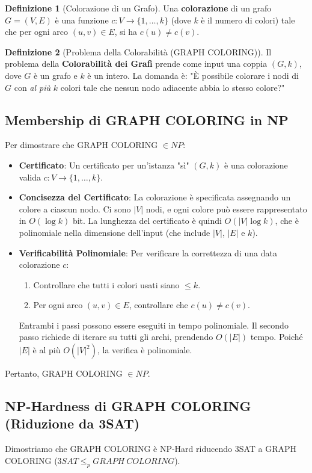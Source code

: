 \documentclass[a4paper]{article}
\theoremstyle{definition} %
\newtheorem{definition}{Definizione}
\begin{document}
\begin{definition}[Colorazione di un Grafo]
Una \textbf{colorazione} di un grafo $G=(V, E)$ è una funzione $c: V \to \{1, \dots, k\}$ (dove $k$ è il numero di colori) tale che per ogni arco $(u, v) \in E$, si ha $c(u) \ne c(v)$.
\end{definition}

\begin{definition}[Problema della Colorabilità (GRAPH COLORING)]
Il problema della \textbf{Colorabilità dei Grafi} prende come input una coppia $(G, k)$, dove $G$ è un grafo e $k$ è un intero.
La domanda è: "È possibile colorare i nodi di $G$ con \emph{al più} $k$ colori tale che nessun nodo adiacente abbia lo stesso colore?"
\end{definition}

\subsection{Membership di GRAPH COLORING in NP}
Per dimostrare che GRAPH COLORING $\in NP$:
\begin{itemize}
    \item \textbf{Certificato}: Un certificato per un'istanza "sì" $(G, k)$ è una colorazione valida $c: V \to \{1, \dots, k\}$.
    \item \textbf{Concisezza del Certificato}: La colorazione è specificata assegnando un colore a ciascun nodo. Ci sono $|V|$ nodi, e ogni colore può essere rappresentato in $O(\log k)$ bit. La lunghezza del certificato è quindi $O(|V| \log k)$, che è polinomiale nella dimensione dell'input (che include $|V|$, $|E|$ e $k$).
    \item \textbf{Verificabilità Polinomiale}: Per verificare la correttezza di una data colorazione $c$:
        \begin{enumerate}
            \item Controllare che tutti i colori usati siano $\le k$.
            \item Per ogni arco $(u, v) \in E$, controllare che $c(u) \ne c(v)$.
        \end{enumerate}
    Entrambi i passi possono essere eseguiti in tempo polinomiale. Il secondo passo richiede di iterare su tutti gli archi, prendendo $O(|E|)$ tempo. Poiché $|E|$ è al più $O(|V|^2)$, la verifica è polinomiale.
\end{itemize}
Pertanto, GRAPH COLORING $\in NP$.

\subsection{NP-Hardness di GRAPH COLORING (Riduzione da 3SAT)}
Dimostriamo che GRAPH COLORING è NP-Hard riducendo 3SAT a GRAPH COLORING ($3SAT \le_p GRAPH\ COLORING$).
\end{document}
